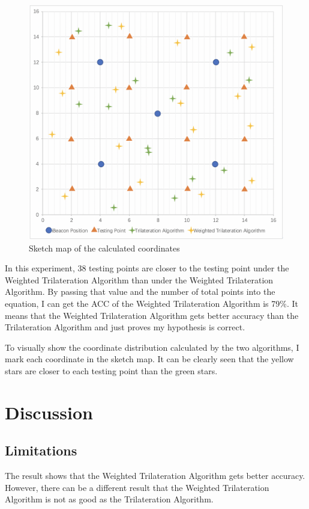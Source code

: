 \documentclass{sigchi}
\begin{document}
\begin{figure}[htbp]
\centering
\includegraphics[width=1\columnwidth]{7.png}
\caption{Sketch map of the calculated coordinates}
\label{fig:universe}
\end{figure}

In this experiment, 38 testing points are closer to the testing point under the Weighted Trilateration Algorithm than under the Weighted Trilateration Algorithm. By passing that value and the number of total points into the equation, I can get the ACC of the Weighted Trilateration Algorithm is 79\%. It means that the Weighted Trilateration Algorithm gets better accuracy than the Trilateration Algorithm and just proves my hypothesis is correct.

To visually show the coordinate distribution calculated by the two algorithms, I mark each coordinate in the sketch map. It can be clearly seen that the yellow stars are closer to each testing point than the green stars.


\section{Discussion}
\subsection{Limitations}
The result shows that the Weighted Trilateration Algorithm gets better accuracy. However, there can be a different result that the Weighted Trilateration Algorithm is not as good as the Trilateration Algorithm.
\end{document}
